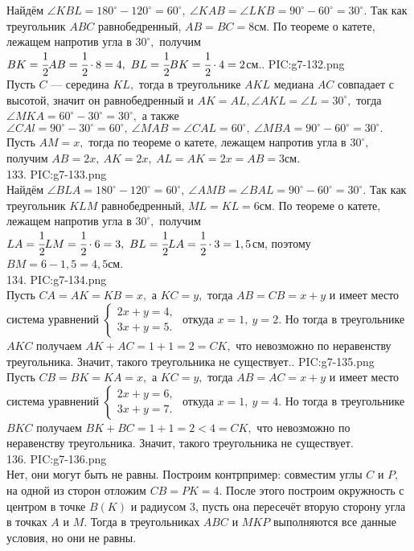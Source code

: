 Найдём $\angle KBL=180^\circ-120^\circ=60^\circ,\ \angle KAB=\angle LKB=90^\circ-60^\circ=30^\circ.$ Так как треугольник $ABC$ равнобедренный, $AB=BC=8$см. По теореме о катете, лежащем напротив угла в $30^\circ,$ получим $BK=\cfrac{1}{2}AB=\cfrac{1}{2}\cdot8=4,\ BL=\cfrac{1}{2}BK=\cfrac{1}{2}\cdot4=2$см.\newpage{}. {{PIC:g7-132.png}}\\
Пусть $C$ --- середина $KL,$ тогда в треугольнике $AKL$ медиана $AC$ совпадает с высотой, значит он равнобедренный и  $AK=AL, \angle AKL=\angle L=30^\circ,$ тогда $\angle MKA=60^\circ-30^\circ=30^\circ,$ а также $\angle CAl=90^\circ-30^\circ=60^\circ,\ \angle MAB=\angle CAL=60^\circ,\ \angle MBA=90^\circ-60^\circ=30^\circ.$
Пусть $AM=x,$ тогда по теореме о катете, лежащем напротив угла в $30^\circ,$ получим $AB=2x,\ AK=2x,\ AL=AK=2x=AB=3$см.\\
133. {{PIC:g7-133.png}}\\
Найдём $\angle BLA=180^\circ-120^\circ=60^\circ,\ \angle AMB=\angle BAL=90^\circ-60^\circ=30^\circ.$ Так как треугольник $KLM$ равнобедренный, $ML=KL=6$см. По теореме о катете, лежащем напротив угла в $30^\circ,$ получим $LA=\cfrac{1}{2}LM=\cfrac{1}{2}\cdot6=3,\ BL=\cfrac{1}{2}LA=\cfrac{1}{2}\cdot3=1,5$см, поэтому $BM=6-1,5=4,5$см.\\
134. {{PIC:g7-134.png}}\\
Пусть $CA=AK=KB=x,$ а $KC=y,$ тогда $AB=CB=x+y$ и имеет место система уравнений $\begin{cases} 2x+y=4,\\ 3x+y=5.\end{cases}$ откуда $x=1,\ y=2.$ Но тогда в треугольнике $AKC$ получаем $AK+AC=1+1=2=CK,$ что невозможно по неравенству треугольника. Значит, такого треугольника не существует.\newpage{}. {{PIC:g7-135.png}}\\
Пусть $CB=BK=KA=x,$ а $KC=y,$ тогда $AB=AC=x+y$ и имеет место система уравнений $\begin{cases} 2x+y=6,\\ 3x+y=7.\end{cases}$ откуда $x=1,\ y=4.$ Но тогда в треугольнике $BKC$ получаем $BK+BC=1+1=2<4=CK,$ что невозможно по неравенству треугольника. Значит, такого треугольника не существует.\\
136. {{PIC:g7-136.png}}\\
Нет, они могут быть не равны. Построим контрпример: совместим углы $C$ и $P,$ на одной из сторон отложим $CB=PK=4.$ После этого построим окружность с центром в точке $B(K)$ и радиусом 3, пусть она пересечёт вторую сторону угла в точках $A$ и $M.$ Тогда в треугольниках $ABC$ и $MKP$ выполняются все данные условия, но они не равны.\\
